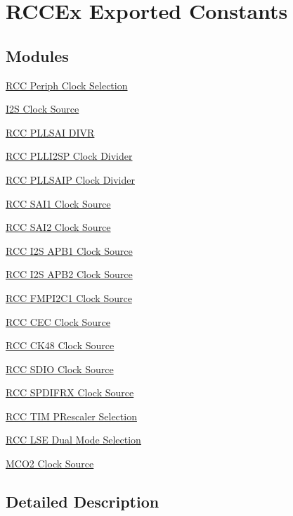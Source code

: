 \hypertarget{group___r_c_c_ex___exported___constants}{}\section{R\+C\+C\+Ex Exported Constants}
\label{group___r_c_c_ex___exported___constants}
\subsection*{Modules}
\begin{DoxyCompactItemize}
\item 
\hyperlink{group___r_c_c_ex___periph___clock___selection}{R\+C\+C Periph Clock Selection}
\item 
\hyperlink{group___r_c_c_ex___i2_s___clock___source}{I2\+S Clock Source}
\item 
\hyperlink{group___r_c_c_ex___p_l_l_s_a_i___d_i_v_r}{R\+C\+C P\+L\+L\+S\+A\+I D\+I\+VR}
\item 
\hyperlink{group___r_c_c_ex___p_l_l_i2_s_p___clock___divider}{R\+C\+C P\+L\+L\+I2\+S\+P Clock Divider}
\item 
\hyperlink{group___r_c_c_ex___p_l_l_s_a_i_p___clock___divider}{R\+C\+C P\+L\+L\+S\+A\+I\+P Clock Divider}
\item 
\hyperlink{group___r_c_c_ex___s_a_i1___clock___source}{R\+C\+C S\+A\+I1 Clock Source}
\item 
\hyperlink{group___r_c_c_ex___s_a_i2___clock___source}{R\+C\+C S\+A\+I2 Clock Source}
\item 
\hyperlink{group___r_c_c_ex___i2_s_a_p_b1___clock___source}{R\+C\+C I2\+S A\+P\+B1 Clock Source}
\item 
\hyperlink{group___r_c_c_ex___i2_s_a_p_b2___clock___source}{R\+C\+C I2\+S A\+P\+B2 Clock Source}
\item 
\hyperlink{group___r_c_c_ex___f_m_p_i2_c1___clock___source}{R\+C\+C F\+M\+P\+I2\+C1 Clock Source}
\item 
\hyperlink{group___r_c_c_ex___c_e_c___clock___source}{R\+C\+C C\+E\+C Clock Source}
\item 
\hyperlink{group___r_c_c_ex___c_k48___clock___source}{R\+C\+C C\+K48 Clock Source}
\item 
\hyperlink{group___r_c_c_ex___s_d_i_o___clock___source}{R\+C\+C S\+D\+I\+O Clock Source}
\item 
\hyperlink{group___r_c_c_ex___s_p_d_i_f_r_x___clock___source}{R\+C\+C S\+P\+D\+I\+F\+R\+X Clock Source}
\item 
\hyperlink{group___r_c_c_ex___t_i_m___p_rescaler___selection}{R\+C\+C T\+I\+M P\+Rescaler Selection}
\item 
\hyperlink{group___r_c_c_ex___l_s_e___dual___mode___selection}{R\+C\+C L\+S\+E Dual Mode Selection}
\item 
\hyperlink{group___r_c_c___m_c_o2___clock___source}{M\+C\+O2 Clock Source}
\end{DoxyCompactItemize}


\subsection{Detailed Description}
